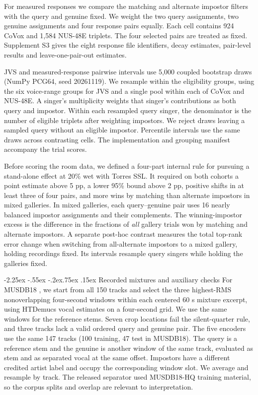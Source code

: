 \documentclass[10pt,a4paper]{article}
\makeatletter
\renewcommand\subsection{\@startsection{subsection}{2}{\z@}%
  {-2.25ex \@plus -.55ex \@minus -.2ex}{.75ex \@plus .15ex}%
  {\normalfont\normalsize\sffamily\bfseries}}
\makeatother
\begin{document}
For measured responses we compare the matching and alternate impostor filters with the query and genuine fixed. We weight the two query assignments, two genuine assignments and four response pairs equally. Each cell contains 924 CoVox and 1,584 NUS-48E triplets. The four selected pairs are treated as fixed. Supplement S3 gives the eight response file identifiers, decay estimates, pair-level results and leave-one-pair-out estimates.

JVS and measured-response pairwise intervals use 5,000 coupled bootstrap draws (NumPy PCG64, seed 20261119). We resample within the eligibility groups, using the six voice-range groups for JVS and a single pool within each of CoVox and NUS-48E. A singer's multiplicity weights that singer's contributions as both query and impostor. Within each resampled query singer, the denominator is the number of eligible triplets after weighting impostors. We reject draws leaving a sampled query without an eligible impostor. Percentile intervals use the same draws across contrasting cells. The implementation and grouping manifest accompany the trial scores.

Before scoring the room data, we defined a four-part internal rule for pursuing a stand-alone effect at 20\% wet with Torres SSL. It required on both cohorts a point estimate above 5 pp, a lower 95\% bound above 2 pp, positive shifts in at least three of four pairs, and more wins by matching than alternate impostors in mixed galleries. In mixed galleries, each query--genuine pair uses 16 nearly balanced impostor assignments and their complements. The winning-impostor excess is the difference in the fractions of \emph{all} gallery trials won by matching and alternate impostors. A separate post-hoc contrast measures the total top-rank error change when switching from all-alternate impostors to a mixed gallery, holding recordings fixed. Its intervals resample query singers while holding the galleries fixed.

\subsection{Recorded mixtures and auxiliary checks}
For MUSDB18 \cite{musdb}, we start from all 150 tracks and select the three highest-RMS nonoverlapping four-second windows within each centered 60 s mixture excerpt, using HTDemucs vocal estimates on a four-second grid. We use the same windows for the reference stems. Seven crop locations fail the silent-quarter rule, and three tracks lack a valid ordered query and genuine pair. The five encoders use the same 147 tracks (100 training, 47 test in MUSDB18). The query is a reference stem and the genuine is another window of the same track, evaluated as stem and as separated vocal at the same offset. Impostors have a different credited artist label and occupy the corresponding window slot. We average and resample by track. The released separator used MUSDB18-HQ training material, so the corpus splits and overlap are relevant to interpretation.
\end{document}
